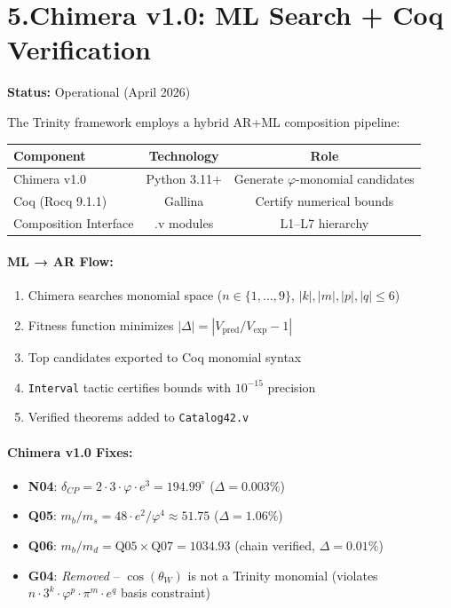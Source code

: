 \documentclass[12pt,a4paper]{article}
\newcommand{\ph}{\varphi}
\begin{document}
\section*{5.\quad Chimera v1.0: ML Search + Coq Verification}

\textbf{Status:} Operational (April 2026)

The Trinity framework employs a hybrid AR+ML composition pipeline:

\begin{center}\small
\begin{tabular}{lcc}
\toprule
\textbf{Component} & \textbf{Technology} & \textbf{Role} \\
\midrule
Chimera v1.0 & Python 3.11+ & Generate $\ph$-monomial candidates \\
Coq (Rocq 9.1.1) & Gallina & Certify numerical bounds \\
Composition Interface & .v modules & L1--L7 hierarchy \\
\bottomrule
\end{tabular}
\end{center}

\paragraph{ML → AR Flow:}
\begin{enumerate}
  \item Chimera searches monomial space ($n\in\{1,\dots,9\}$, $|k|,|m|,|p|,|q|\le 6$)
  \item Fitness function minimizes $|\Delta| = |V_{\text{pred}}/V_{\text{exp}}-1|$
  \item Top candidates exported to Coq monomial syntax
  \item \texttt{Interval} tactic certifies bounds with $10^{-15}$ precision
  \item Verified theorems added to \texttt{Catalog42.v}
\end{enumerate}

\paragraph{Chimera v1.0 Fixes:}
\begin{itemize}
  \item \textbf{N04}: $\delta_{CP} = 2\cdot3\cdot\ph\cdot e^3 = 194.99^\circ$ ($\Delta=0.003\%$)
  \item \textbf{Q05}: $m_b/m_s = 48\cdot e^2/\ph^4 \approx 51.75$ ($\Delta=1.06\%$)
  \item \textbf{Q06}: $m_b/m_d = \text{Q05} \times \text{Q07} = 1034.93$ (chain verified, $\Delta=0.01\%$)
  \item \textbf{G04}: \textit{Removed} -- $\cos(\theta_W)$ is not a Trinity monomial (violates $n\cdot3^k\cdot\ph^p\cdot\pi^m\cdot e^q$ basis constraint)
\end{itemize}
\end{document}

